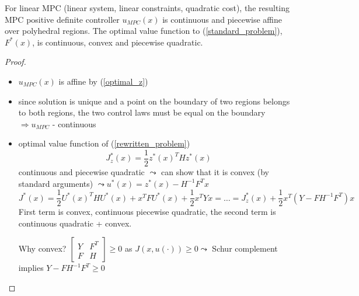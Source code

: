 \begin{Theorem}
For linear MPC (linear system, linear constraints, quadratic cost), the resulting MPC positive definite controller $u_{MPC}(x)$ is continuous and piecewise affine over polyhedral regions. The optimal value function to (\ref{standard_problem}), $F^*(x)$, is continuous, convex and piecewise quadratic.
\begin{proof}
\begin{itemize}
\item $u_{MPC}(x)$ is affine by (\ref{optimal_z})
\item since solution is unique and a point on the boundary of two regions belongs to both regions, the two control laws must be equal on the boundary $\Rightarrow u_{MPC}$ - continuous
\item optimal value function of (\ref{rewritten_problem})
\begin{equation*}
J_z^*(x) = \frac{1}{2}z^*(x)^THz^*(x) 
\end{equation*} 
continuous and piecewise quadratic
$\leadsto$ can show that it is convex (by standard arguments) $\leadsto u^*(x) = z^*(x) - H^{-1}F^Tx$
\begin{equation*}
J^*(x) = \frac{1}{2}U^*(x)^THU^*(x) + x^TFU^*(x) + \frac{1}{2}x^TYx = \dots = J_z^*(x) + \frac{1}{2}x^T(Y-FH^{-1}F^T)x
\end{equation*}
First term is convex, continuous piecewise quadratic, the second term is continuous quadratic + convex.

Why convex?
$\begin{bmatrix}
Y & F^T \\
F & H
\end{bmatrix} \geq 0$ as $J(x,u(\cdot)) \geq 0 \leadsto$ Schur complement implies $Y-FH^{-1}F^T \geq 0$ 
\end{itemize}
\end{proof}
\end{Theorem}